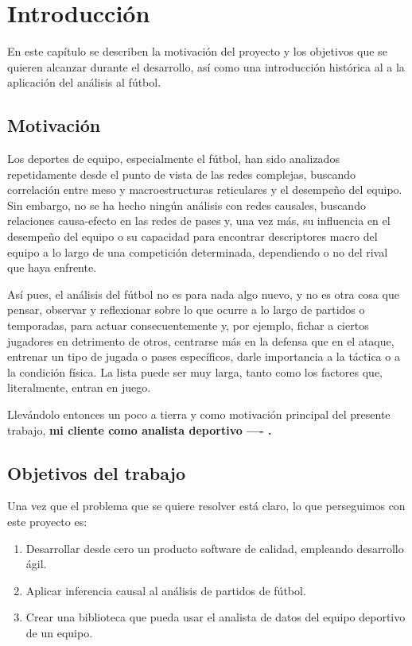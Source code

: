 \chapter{Introducción}

En este capítulo se describen la motivación del proyecto y los objetivos que
se quieren alcanzar durante el desarrollo, así como una introducción histórica al
a la aplicación del análisis al fútbol. 

\section{Motivación}

Los deportes de equipo, especialmente el fútbol, han sido analizados 
repetidamente desde el punto de vista de las redes complejas, buscando 
correlación entre meso y macroestructuras reticulares y el desempeño del 
equipo. Sin embargo, no se ha hecho ningún análisis con redes causales, 
buscando relaciones causa-efecto en las redes de pases y, una vez más, 
su influencia en el desempeño del equipo o su capacidad para encontrar 
descriptores macro del equipo a lo largo de una competición determinada, 
dependiendo o no del rival que haya enfrente.

Así pues, el análisis del fútbol no es para nada algo nuevo, y no es otra cosa que 
pensar, observar y reflexionar sobre lo que ocurre a lo largo de partidos 
o temporadas, para actuar consecuentemente y, por ejemplo, fichar a 
ciertos jugadores en detrimento de otros, centrarse más en la defensa 
que en el ataque, entrenar un tipo de jugada o pases específicos, darle 
importancia a la táctica o a la condición física. La lista puede ser muy 
larga, tanto como los factores que, literalmente, entran en juego.

Llevándolo entonces un poco a tierra y como motivación principal del presente trabajo,
\textbf{mi cliente como analista deportivo ---- .}

\section{Objetivos del trabajo} \label{sect:goals}

Una vez que el problema que se quiere resolver está claro, lo que perseguimos
con este proyecto es: 

\begin{enumerate}
    \item \label{obj:1} Desarrollar desde cero un producto software de calidad, empleando desarrollo ágil.
    \item \label{obj:2} Aplicar inferencia causal al análisis de partidos de fútbol.
    \item \label{obj:3} Crear una biblioteca que pueda usar el analista de datos del equipo deportivo de un equipo.
\end{enumerate}

